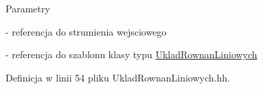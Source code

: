 \begin{DoxyParams}{Parametry}
\item[\mbox{\tt[in,out]} {\em \&Strm}]-\/ referencja do strumienia wejsciowego \item[\mbox{\tt[in,out]} {\em \&UklRown}]-\/ referencja do szablonu klasy typu \hyperlink{class_uklad_rownan_liniowych}{UkladRownanLiniowych} \end{DoxyParams}


Definicja w linii 54 pliku UkladRownanLiniowych.hh.

